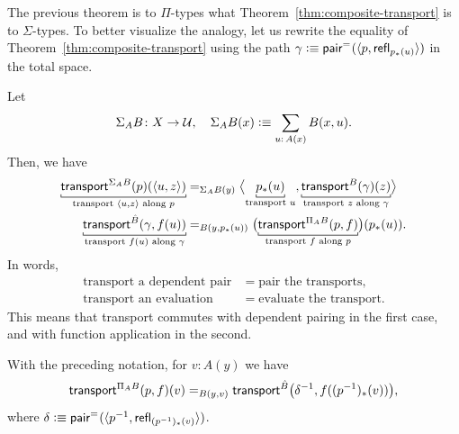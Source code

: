 \begin{rem}
    The previous theorem is to\/ $\Pi$-types what Theorem~\ref{thm:composite-transport} is to\/ $\Sigma$-types. To better visualize the analogy, let us rewrite the equality of Theorem~\ref{thm:composite-transport} using the path\/ $\gamma\mathrel{\vcentcolon}\equiv\mathsf{pair}^{\mathrel{=_{}}}(\langle p,\mathsf{refl}_{p_*(u)}\rangle)$ in the total space.
    
    Let
    \[
        \Sigma_AB\colon X\to\univ,
        \quad\Sigma_AB(x)\defeq\sum_{u\colon A(x)}B(x,u).
    \]
    Then, we have
    \begin{align*}
        \explain[\text{transport }\dep{u,z}\text{ along }p]
            {\fun{transport}^{\Sigma_AB}(p)(\dep{u,z})}
        &\eq{\Sigma_AB(y)}
            \bigdep{
            \explain[\text{transport }u]{p_*(u)},
            \explain[\text{transport }z\text{ along }\gamma]
            {\fun{transport}^B(\gamma)(z)}
            }\\
    \explain[\text{transport }f(u)\text{ along }\gamma]
        {\fun{transport}^{\hat B}(\gamma,f(u))}
        &\eq{B(y,p_*(u))}
        \bigl(
        \explain[\text{transport }f\text{ along }p]
        {\fun{transport}^{\Pi_A B}(p,f)}
        \bigr)(p_*(u)).
    \end{align*}
    In words,
    \begin{align*}
        \text{transport a dependent pair}
            &= \text{pair the transports},\\
        \text{transport an evaluation}
            &= \text{evaluate the transport}.
    \end{align*}
    This means that transport commutes with dependent pairing in the first case, and with function application in the second.
\end{rem}

\begin{cor}\label{cor:dependent-transport-decomp}
    With the preceding notation, for\/ $v\colon A(y)$ we have
    \[
        \mathsf{transport}^{\Pi_AB}(p,f)(v)
        \mathrel{=_{B(y,v)}}
        \mathsf{transport}^{\hat B}
        \bigl(
            \delta^{-1},f((p^{-1})_*(v))
        \bigr),
    \]
    where\/ $\delta\mathrel{\vcentcolon}\equiv\mathsf{pair}^{\mathrel{=_{}}}(\langle p^{-1},\mathsf{refl}_{(p^{-1})_*(v)}\rangle)$.
\end{cor}

